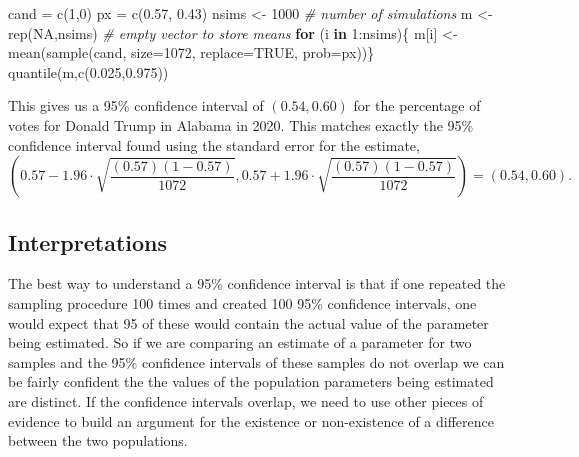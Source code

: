 \documentclass[
]{book}
\newenvironment{Shaded}{\begin{snugshade}}{\end{snugshade}}
\newcommand{\AttributeTok}[1]{\textcolor[rgb]{0.77,0.63,0.00}{#1}}
\newcommand{\CommentTok}[1]{\textcolor[rgb]{0.56,0.35,0.01}{\textit{#1}}}
\newcommand{\ConstantTok}[1]{\textcolor[rgb]{0.00,0.00,0.00}{#1}}
\newcommand{\ControlFlowTok}[1]{\textcolor[rgb]{0.13,0.29,0.53}{\textbf{#1}}}
\newcommand{\DecValTok}[1]{\textcolor[rgb]{0.00,0.00,0.81}{#1}}
\newcommand{\FloatTok}[1]{\textcolor[rgb]{0.00,0.00,0.81}{#1}}
\newcommand{\FunctionTok}[1]{\textcolor[rgb]{0.00,0.00,0.00}{#1}}
\newcommand{\NormalTok}[1]{#1}
\newcommand{\OtherTok}[1]{\textcolor[rgb]{0.56,0.35,0.01}{#1}}
\newcommand{\SpecialCharTok}[1]{\textcolor[rgb]{0.00,0.00,0.00}{#1}}
\theoremstyle{definition}
\theoremstyle{definition}
\theoremstyle{definition}
\theoremstyle{definition}
\theoremstyle{remark}
\begin{document}
\begin{Shaded}
\begin{Highlighting}[]
\NormalTok{cand }\OtherTok{=} \FunctionTok{c}\NormalTok{(}\DecValTok{1}\NormalTok{,}\DecValTok{0}\NormalTok{)}
\NormalTok{px }\OtherTok{=} \FunctionTok{c}\NormalTok{(}\FloatTok{0.57}\NormalTok{, }\FloatTok{0.43}\NormalTok{)}
\NormalTok{nsims }\OtherTok{\textless{}{-}} \DecValTok{1000} \CommentTok{\# number of simulations}
\NormalTok{m }\OtherTok{\textless{}{-}} \FunctionTok{rep}\NormalTok{(}\ConstantTok{NA}\NormalTok{,nsims) }\CommentTok{\# empty vector to store means}
\ControlFlowTok{for}\NormalTok{ (i }\ControlFlowTok{in} \DecValTok{1}\SpecialCharTok{:}\NormalTok{nsims)\{ m[i] }\OtherTok{\textless{}{-}} \FunctionTok{mean}\NormalTok{(}\FunctionTok{sample}\NormalTok{(cand, }\AttributeTok{size=}\DecValTok{1072}\NormalTok{, }\AttributeTok{replace=}\ConstantTok{TRUE}\NormalTok{, }\AttributeTok{prob=}\NormalTok{px))\}}
\FunctionTok{quantile}\NormalTok{(m,}\FunctionTok{c}\NormalTok{(}\FloatTok{0.025}\NormalTok{,}\FloatTok{0.975}\NormalTok{))}
\end{Highlighting}
\end{Shaded}

This gives us a 95\% confidence interval of \((0.54,0.60)\) for the percentage of votes for Donald Trump in Alabama in 2020. This matches exactly the 95\% confidence interval found using the standard error for the estimate, \[\left( 0.57-1.96 \cdot \sqrt{\frac{(0.57)(1-0.57)}{1072}},  0.57+1.96 \cdot \sqrt{\frac{(0.57)(1-0.57)}{1072}}\right) = (0.54,0.60).\]

\hypertarget{interpretations}{%
\subsection{Interpretations}\label{interpretations}}

The best way to understand a 95\% confidence interval is that if one repeated the sampling procedure 100 times and created 100 95\% confidence intervals, one would expect that 95 of these would contain the actual value of the parameter being estimated. So if we are comparing an estimate of a parameter for two samples and the 95\% confidence intervals of these samples do not overlap we can be fairly confident the the values of the population parameters being estimated are distinct. If the confidence intervals overlap, we need to use other pieces of evidence to build an argument for the existence or non-existence of a difference between the two populations.
\end{document}
